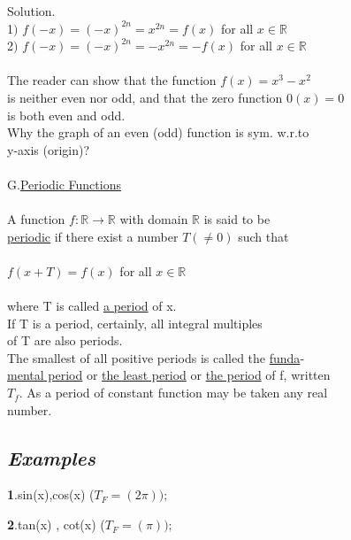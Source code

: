 \documentclass[11pt]{amsbook}
\begin{document}
Solution.\\
	1$)$ $f(-x)=(-x)^{2n}=x^{2n}=f(x)$ for all $x\in \mathbb{R} $\\
	2$)$ $f(-x)=(-x)^{2n}=-x^{2n}=-f(x)$ for all $x\in \mathbb{R} $\\
\\
	The reader can show that the function $ f(x)=x^{3}-x^{2} $\\
is neither even nor odd, and that the zero function $ 0(x)= 0 $\\
is both even and odd.\\
	Why the graph of an even (odd) function is sym. w.r.to\\
y-axis (origin)?\\
\\
G.\underline{Periodic Functions}\\
\\
A function $f:\mathbb{R}\rightarrow \mathbb{R}$ with domain $\mathbb{R}$ is said to be\\
\underline{periodic} if there exist a number $T(\neq 0)$ such that\\
\\
		$f(x + T)=f(x)$ for all $x\in \mathbb{R} $\\
\\
where T is called \underline{a period} of x.\\
If T is a period, certainly, all integral multiples\\
of T are also periods.\\
	The smallest of all positive periods is called the \underline{funda}-\\
\underline{mental period} or \underline{the least period} or \underline{the period} of f, written\\
$T_{f}$. As a period of constant function may be taken any real\\
number.\\




\subsection{\emph{Examples}}

\textbf{1}.sin(x),cos(x)  ($T_{F}=(2\pi ));$

\bigskip 

\textbf{2}.tan(x) , cot(x) ($T_{F}=(\pi ));$

\bigskip 
\end{document}

